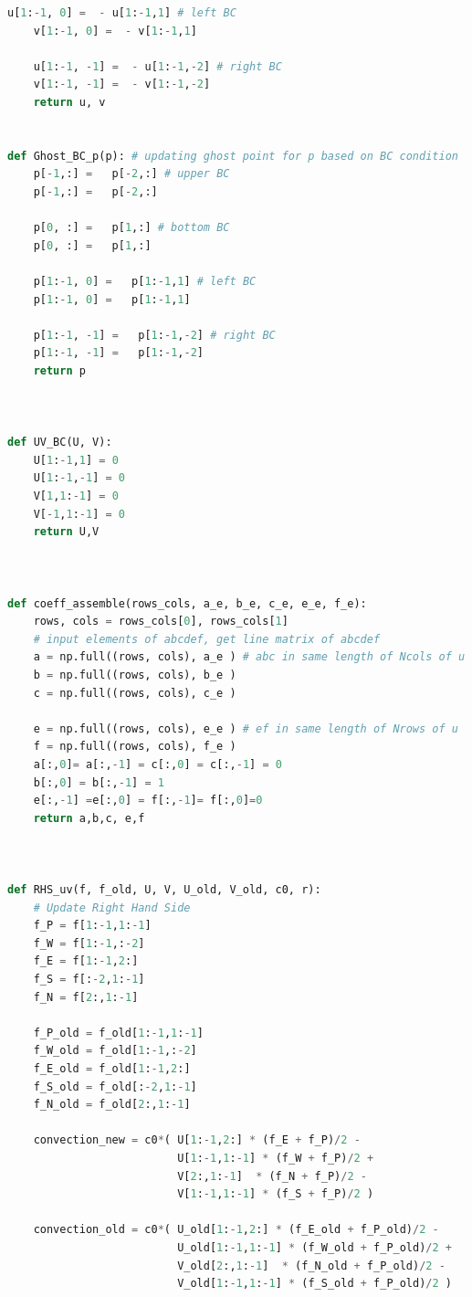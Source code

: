 \documentclass[12pt]{article}
\begin{document}
\begin{scriptsize}
\begin{lstlisting}[language=python,caption={Lid Driven Cavity Solver}]
    u[1:-1, 0] =  - u[1:-1,1] # left BC
    v[1:-1, 0] =  - v[1:-1,1]

    u[1:-1, -1] =  - u[1:-1,-2] # right BC
    v[1:-1, -1] =  - v[1:-1,-2]
    return u, v


def Ghost_BC_p(p): # updating ghost point for p based on BC condition
    p[-1,:] =   p[-2,:] # upper BC
    p[-1,:] =   p[-2,:]

    p[0, :] =   p[1,:] # bottom BC
    p[0, :] =   p[1,:]

    p[1:-1, 0] =   p[1:-1,1] # left BC
    p[1:-1, 0] =   p[1:-1,1]

    p[1:-1, -1] =   p[1:-1,-2] # right BC
    p[1:-1, -1] =   p[1:-1,-2]
    return p



def UV_BC(U, V):
    U[1:-1,1] = 0
    U[1:-1,-1] = 0
    V[1,1:-1] = 0
    V[-1,1:-1] = 0
    return U,V



def coeff_assemble(rows_cols, a_e, b_e, c_e, e_e, f_e):
    rows, cols = rows_cols[0], rows_cols[1]
    # input elements of abcdef, get line matrix of abcdef
    a = np.full((rows, cols), a_e ) # abc in same length of Ncols of u
    b = np.full((rows, cols), b_e )
    c = np.full((rows, cols), c_e )

    e = np.full((rows, cols), e_e ) # ef in same length of Nrows of u
    f = np.full((rows, cols), f_e )
    a[:,0]= a[:,-1] = c[:,0] = c[:,-1] = 0
    b[:,0] = b[:,-1] = 1
    e[:,-1] =e[:,0] = f[:,-1]= f[:,0]=0
    return a,b,c, e,f



def RHS_uv(f, f_old, U, V, U_old, V_old, c0, r): 
    # Update Right Hand Side
    f_P = f[1:-1,1:-1]
    f_W = f[1:-1,:-2]
    f_E = f[1:-1,2:]
    f_S = f[:-2,1:-1]
    f_N = f[2:,1:-1]

    f_P_old = f_old[1:-1,1:-1]
    f_W_old = f_old[1:-1,:-2]
    f_E_old = f_old[1:-1,2:]
    f_S_old = f_old[:-2,1:-1]
    f_N_old = f_old[2:,1:-1]

    convection_new = c0*( U[1:-1,2:] * (f_E + f_P)/2 -
                          U[1:-1,1:-1] * (f_W + f_P)/2 +
                          V[2:,1:-1]  * (f_N + f_P)/2 -
                          V[1:-1,1:-1] * (f_S + f_P)/2 )
    
    convection_old = c0*( U_old[1:-1,2:] * (f_E_old + f_P_old)/2 -
                          U_old[1:-1,1:-1] * (f_W_old + f_P_old)/2 +
                          V_old[2:,1:-1]  * (f_N_old + f_P_old)/2 -
                          V_old[1:-1,1:-1] * (f_S_old + f_P_old)/2 )
    

\end{lstlisting}
\end{scriptsize}
\end{document}
